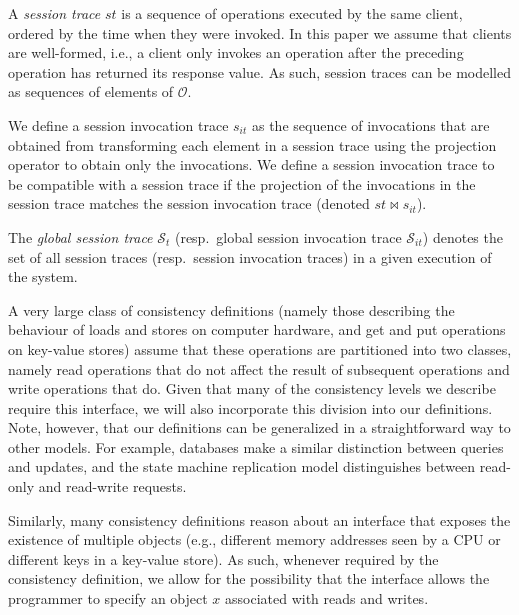 \documentclass[journal,compsoc]{IEEEtran}
\begin{document}
A \emph{session trace} $\mathit{st}$ is a sequence of operations executed by the same client, ordered by the time when they were invoked. In this paper we assume that clients are well-formed, i.e., a client only invokes an operation after the preceding operation has returned its response value. As such, session traces can be modelled as sequences of elements of $\mathcal{O}$.

We define a session invocation trace $\mathit{s}_{it}$ as the sequence of invocations that are obtained from transforming each element in a session trace using the projection operator to obtain only the invocations. We define a session invocation trace to be compatible with a session trace if the projection of the invocations in the session trace matches the session invocation trace (denoted $st\bowtie s_{it}$).

The \emph{global session trace} $\mathcal{S}_t$ (resp.\ global session invocation trace $\mathcal{S}_{it}$) denotes the set of all
   session traces (resp.\ session invocation traces) in a given execution of the system.

A very large class of consistency definitions (namely those describing the behaviour of loads and stores on computer hardware, and get and put operations on key-value stores) assume that these operations are partitioned into two classes, namely read operations that do not affect the result of subsequent operations and write operations that do. Given that many of the consistency levels we describe require this interface, we will also incorporate this division into our definitions. Note, however, that our definitions can be generalized in a straightforward way to other models. For example, databases make a similar distinction between queries and updates, and the state machine replication model distinguishes between read-only and read-write requests.

Similarly, many consistency definitions reason about an interface that exposes the existence of multiple objects (e.g., different memory addresses seen by a CPU or different keys in a key-value store). As such, whenever required by the consistency definition, we allow for the possibility that the interface allows the programmer to specify an object $x$ associated with reads and writes.

\end{document}
